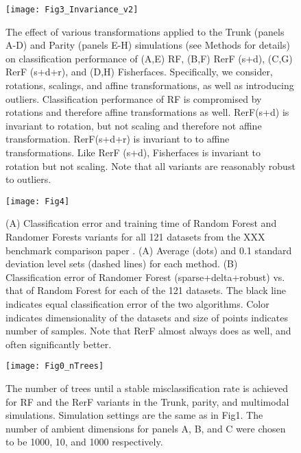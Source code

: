 \documentclass{article} %
\begin{document}
\begin{figure}[h]
\begin{center}
\texttt{[image: Fig3\_Invariance\_v2]}
\end{center}
\caption{The effect of various transformations applied to the Trunk (panels A-D) and Parity (panels E-H) simulations (see Methods for details) on classification performance of (A,E) RF, (B,F) RerF (s+d), (C,G) RerF (s+d+r), and (D,H) Fisherfaces. Specifically, we consider, rotations, scalings, and affine transformations, as well as introducing outliers. Classification performance of RF is compromised by rotations and therefore affine transformations as well. RerF(s+d) is invariant to rotation, but not scaling and therefore not affine transformation. RerF(s+d+r) is invariant to to affine transformations. Like RerF (s+d), Fisherfaces is invariant to rotation but not scaling. Note that all variants are reasonably robust to outliers.}
\end{figure}

\begin{figure}[h]
\begin{center}
\texttt{[image: Fig4]}
\end{center}
\caption{(A) Classification error and training time of Random Forest and Randomer Forests variants for all 121 datasets from the XXX benchmark comparison paper \cite{???}. (A) Average (dots) and 0.1 standard deviation level sets (dashed lines) for each method. (B) Classification error of Randomer Forest (sparse+delta+robust) vs. that of Random Forest for each of the 121 datasets. The black line indicates equal classification error of the two algorithms. Color indicates dimensionality of the datasets and size of points indicates number of samples. Note that RerF almost always does as well, and often significantly better.}
\end{figure}

\appendix
\setcounter{figure}{0}
\renewcommand\thefigure{A\arabic{figure}}

\begin{figure}[h]
\begin{center}
\texttt{[image: Fig0\_nTrees]}
\end{center}
\caption{The number of trees until a stable misclassification rate is achieved for RF and the RerF variants in the Trunk, parity, and multimodal simulations. Simulation settings are the same as in Fig1. The number of ambient dimensions for panels A, B, and C were chosen to be 1000, 10, and 1000 respectively.}
\end{figure}
\end{document}
